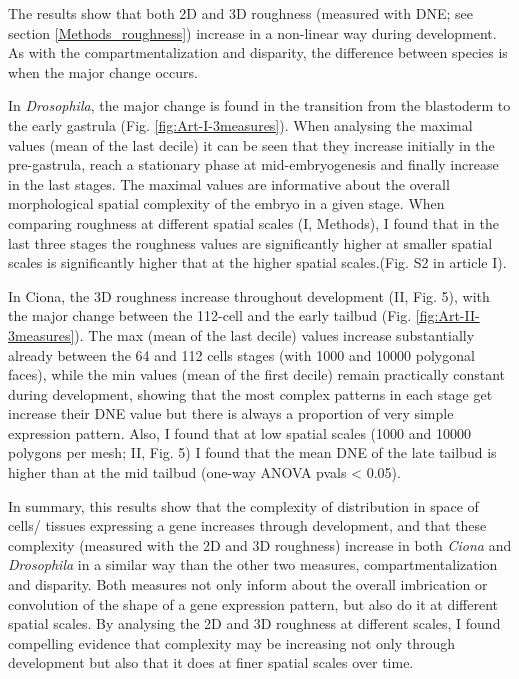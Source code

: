 The results show that both 2D and 3D roughness (measured with DNE; see section \ref{Methods_roughness}) increase in a non-linear way during development.
As with the compartmentalization and disparity, the difference between species is when the major change occurs. 

In \textit{Drosophila}, the major change is found in the transition from the blastoderm to the early gastrula (Fig. \ref{fig:Art-I-3measures}).
When analysing the maximal values (mean of the last decile) it can be seen that they increase initially in the pre-gastrula, reach a stationary phase at mid-embryogenesis and finally increase in the last stages. 
The maximal values are informative about the overall morphological spatial complexity of the embryo in a given stage.
When comparing roughness at different spatial scales (I, Methods), I found that in the last three stages the roughness values are significantly higher at smaller spatial scales is significantly higher that at the higher spatial scales.(Fig. S2 in article I). 

In Ciona, the 3D roughness increase throughout development (II, Fig. 5), with the major change between the 112-cell and the early tailbud (Fig. \ref{fig:Art-II-3measures}).  
The max (mean of the last decile) values increase substantially already between the 64 and 112 cells stages (with 1000 and 10000 polygonal faces), while the min values (mean of the first decile) remain practically constant during development, showing that the most complex patterns in each stage get increase their DNE value but there is always a proportion of very simple expression pattern.
Also, I found that at low spatial scales (1000 and 10000 polygons per mesh; II, Fig. 5) I found that the mean DNE of the late tailbud is higher than at the mid tailbud (one-way ANOVA pvals < 0.05).

In summary, this results show that the complexity of distribution in space of cells/ tissues expressing a gene increases through development, and that these complexity (measured with the 2D and 3D roughness) increase in both \textit{Ciona} and \textit{Drosophila} in a similar way than the other two measures, compartmentalization and disparity. 
Both measures not only inform about the overall imbrication or convolution of the shape of a gene expression pattern, but also do it at different spatial scales. By analysing the 2D and 3D roughness at different scales, I found compelling evidence that complexity may be increasing not only through development but also that it does at finer spatial scales over time.

